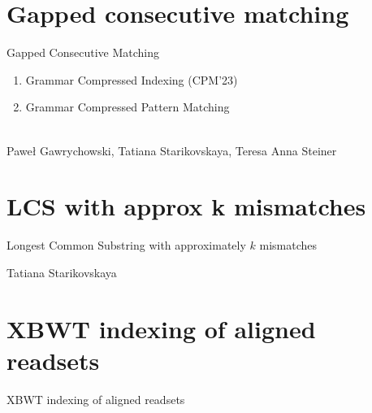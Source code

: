 \appendix
\backupbegin

\section{Gapped consecutive matching}

\begin{frame}
  \centering
  {\Large Gapped Consecutive Matching}
  \begin{minipage}{0.6\textwidth}  
    \begin{enumerate}
      \item Grammar Compressed Indexing (CPM'23)
      \item Grammar Compressed Pattern Matching
    \end{enumerate}
  \end{minipage}\\
  Paweł Gawrychowski, Tatiana Starikovskaya, Teresa Anna Steiner
\end{frame}





\section{LCS with approx k mismatches}
\begin{frame}
  \centering
  {\Large Longest Common Substring with approximately $k$ mismatches}
  
  Tatiana Starikovskaya
\end{frame}



\section{XBWT indexing of aligned readsets}
\begin{frame}
  \centering
  {\Large XBWT indexing of aligned readsets}
  
\end{frame}

%

\backupend